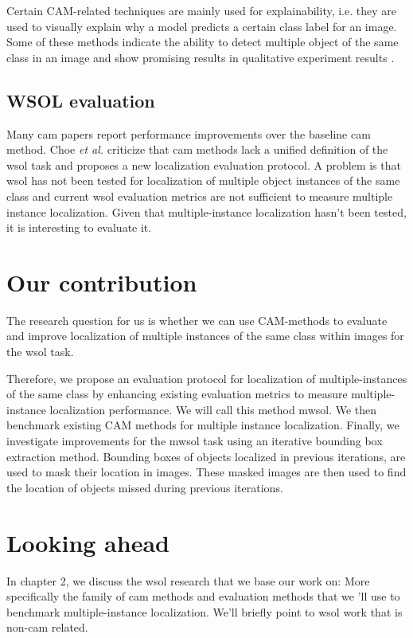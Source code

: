 Certain CAM-related techniques are mainly used for explainability, i.e. they are used to visually explain why a model predicts a certain class label for an image. Some of these methods indicate the ability to detect multiple object of the same class in an image and show promising results in qualitative experiment results \cite{wang2020score}.

\subsection{WSOL evaluation}
Many \acrshort{cam} papers report performance improvements over the baseline \acrshort{cam} method. Choe \textit{et al.} \cite{choe2020evaluating} criticize that \acrshort{cam} methods lack a unified definition of the \acrshort{wsol} task and proposes a new localization evaluation protocol. A problem is that \acrshort{wsol} has not been tested for localization of multiple object instances of the same class and current \acrshort{wsol} evaluation metrics are not sufficient to measure multiple instance localization. Given that multiple-instance localization hasn't been tested, it is interesting to evaluate it. 

\section{Our contribution}
The research question for us is whether we can use CAM-methods to evaluate and improve localization of multiple instances of the same class within images for the \acrshort{wsol} task.

Therefore, we propose an evaluation protocol for localization of multiple-instances of the same class by enhancing existing evaluation metrics \cite{choe2020evaluating} to measure multiple-instance localization performance. We will call this method \acrfull{mwsol}. We then benchmark existing CAM methods for multiple instance localization. Finally, we investigate improvements for the \acrshort{mwsol} task using an iterative bounding box extraction method. Bounding boxes of objects localized in previous iterations, are used to mask their location in images. These masked images are then used to find the location of objects missed during previous iterations.

\section{Looking ahead}
In chapter 2, we discuss the \acrshort{wsol} research that we base our work on: More specifically the family of \acrshort{cam} methods and evaluation methods that we 'll use to benchmark multiple-instance localization. We'll briefly point to \acrshort{wsol} work that is  non-\acrshort{cam} related. 

